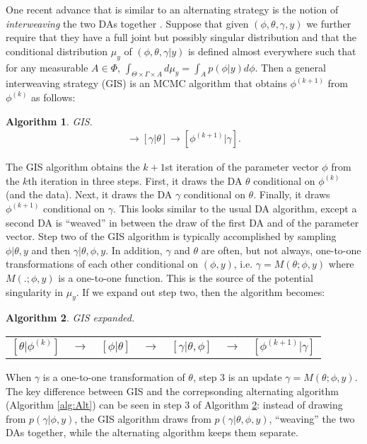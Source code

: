 \documentclass{article}
\newtheorem{alg}{Algorithm}
\begin{document}
One recent advance that is similar to an alternating strategy is the notion of {\it interweaving} the two DAs together \cite{yu2011center}. Suppose that given $(\phi,\theta,\gamma,y)$ we further require that they have a full joint but possibly singular distribution and that the conditional distribution $\mu_y$ of $(\phi,\theta,\gamma|y)$ is defined almost everywhere such that for any measurable $A\in \Phi$, $\int_{\Theta \times \Gamma \times A}d\mu_y = \int_Ap(\phi|y)d\phi$. Then a general interweaving strategy (GIS) is an MCMC algorithm that obtains $\phi^{(k+1)}$ from $\phi^{(k)}$ as follows:
\begin{alg}GIS.\label{alg:GIS}
  \begin{align*}
    [\theta|\phi^{(k)}] \to [\gamma|\theta] \to [\phi^{(k+1)}|\gamma].
  \end{align*}
\end{alg}
\noindent The GIS algorithm obtains the $k+1$st iteration of the parameter vector $\phi$ from the $k$th iteration in three steps. First, it draws the DA $\theta$ conditional on $\phi^{(k)}$ (and the data). Next, it draws the DA $\gamma$ conditional on $\theta$. Finally, it draws $\phi^{(k+1)}$ conditional on $\gamma$. This looks similar to the usual DA algorithm, except a second DA is ``weaved'' in between the draw of the first DA and of the parameter vector. Step two of the GIS algorithm is typically accomplished by sampling $\phi|\theta,y$ and then $\gamma|\theta,\phi,y$. In addition, $\gamma$ and $\theta$ are often, but not always, one-to-one transformations of each other conditional on $(\phi,y)$, i.e. $\gamma = M(\theta;\phi,y)$ where $M(.;\phi,y)$ is a one-to-one function. This is the source of the potential singularity in $\mu_y$. If we expand out step two, then the algorithm becomes:
\begin{alg}GIS expanded.\label{alg:GIS2}\\
  \begin{center}
    \begin{tabular}{lllllll}
      $[\theta|\phi^{(k)}]$& $\to$& $[\phi|\theta]$& $\to $&$[\gamma|\theta,\phi]$& $\to$& $[\phi^{(k+1)}|\gamma]$
    \end{tabular}
  \end{center}
\noindent \end{alg}
When $\gamma$ is a one-to-one transformation of $\theta$, step 3 is an update $\gamma=M(\theta;\phi,y)$. The key difference between GIS and the correpsonding alternating algorithm (Algorithm \ref{alg:Alt}) can be seen in step 3 of Algorithm \ref{alg:GIS2}: instead of drawing from $p(\gamma|\phi,y)$, the GIS algorithm draws from $p(\gamma|\theta,\phi,y)$, ``weaving'' the two DAs together, while the alternating algorithm keeps them separate.
\end{document}
